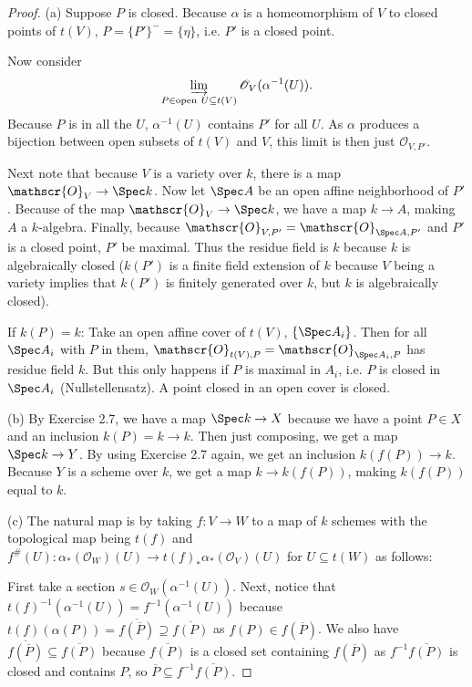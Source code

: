 \begin{proof}
	(a) Suppose $P $ is closed.
	Because $\alpha $ is a homeomorphism of $V $ to closed points of $t(V) $, $P = \{P' \} ^- = \{\eta \}     $, i.e. $P'  $ is a closed point.
	
	Now consider
	\[
		\varinjlim_{P \in \text{open}\ U \subseteq t(V)} \mathscr{O}_V(\alpha ^{-1}(U))
	.\] 
	Because $P $ is in all the $U $, $\alpha ^{-1}(U) $ contains $P'$ for all $U $.
	As $\alpha $ produces a bijection between open subsets of $t(V) $ and $V $, this limit is then just $\mathscr{O}_{V,P' } $.

	Next note that because $V $ is a variety over $k $, there is a map $\mathscr{O}_V \to \Spec k $.
	Now let $\Spec A $ be an open affine neighborhood of $P' $.
	Because of the map $\mathscr{O}_V \to \Spec k $, we have a map $k \to A $, making $A $ a $k $-algebra.
	Finally, because $\mathscr{O}_{V,P'} = \mathscr{O}_{\Spec A,P'} $ and $P' $ is a closed point, $P' $ be maximal.
	Thus the residue field is $k $ because $k $ is algebraically closed ($k(P') $ is a finite field extension of $k $ because $V $ being a variety implies that $k(P') $ is finitely generated over $k $, but $k $ is algebraically closed).

	If $k(P) = k$:
	Take an open affine cover of $t(V) $, $\{\Spec A_i\}   $.
	Then for all $\Spec A_i $ with $P $ in them, $\mathscr{O}_{t(V),P} = \mathscr{O}_{\Spec A_i, P}$ has residue field $k $.
	But this only happens if $P $ is maximal in $A_i $, i.e. $P $ is closed in $\Spec A_i $ (Nullstellensatz).
	A point closed in an open cover is closed.

	(b) By Exercise 2.7, we have a map $\Spec k \to X $ because we have a point $P \in X $ and an inclusion $k(P) = k \to k $.
	Then just composing, we get a map $\Spec k \to Y $.
	By using Exercise 2.7 again, we get an inclusion $k(f(P)) \to k $.
	Because $Y $ is a scheme over $k $, we get a map $k\to k(f(P)) $, making $k(f(P)) $ equal to $k $.

	(c) 
	The natural map is by taking $f: V\to W $ to a map of $k $ schemes with the topological map being $t(f) $ and $f^\#(U): \alpha_{\ast}(\mathscr{O}_W)(U) \to t(f)_\ast \alpha_\ast(\mathscr{O}_V)(U)$ for $U\subseteq t(W) $ as follows:

	First take a section $s \in \mathscr{O}_W(\alpha ^{-1}(U)) $.
	Next, notice that $t(f)^{-1}(\alpha ^{-1}(U)) = f^{-1}(\alpha ^{-1}(U)) $ because $t(f)(\alpha(P)) = \overline{f(\overline{P}) } \supseteq \overline{f(P)}$ as $f(P) \in f(\overline{P})  $. 
	We also have $\overline{f(\overline{P}) } \subseteq \overline{f(P)}   $ because $\overline{f(P)}  $ is a closed set containing $f(\overline{P})  $ as $f^{-1}\overline{f(P)}$ is closed and contains $P $, so $\overline{P} \subseteq f^{-1}\overline{f(P)}   $.


\end{proof}
